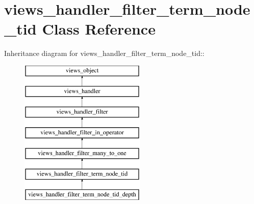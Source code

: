 \hypertarget{classviews__handler__filter__term__node__tid}{
\section{views\_\-handler\_\-filter\_\-term\_\-node\_\-tid Class Reference}
\label{classviews__handler__filter__term__node__tid}
}
Inheritance diagram for views\_\-handler\_\-filter\_\-term\_\-node\_\-tid::\begin{figure}[H]
\begin{center}
\leavevmode
\includegraphics[height=7cm]{classviews__handler__filter__term__node__tid}
\end{center}
\end{figure}
